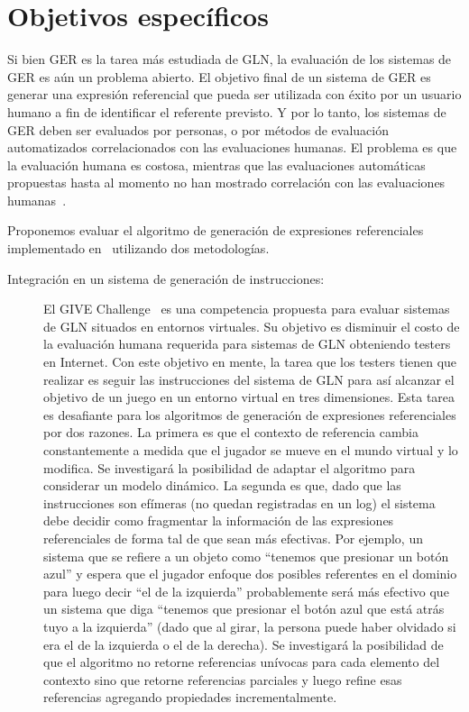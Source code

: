 \section{Objetivos espec\'ificos}
\label{objetivos}

Si bien GER es la tarea m\'as estudiada de GLN, la evaluaci\'on de los sistemas de GER es a\'un un problema abierto. 
El objetivo final de un sistema de GER es generar una expresi\'on referencial que pueda ser utilizada con \'exito por 
un usuario humano a fin de identificar el referente previsto. Y por lo tanto, los sistemas de GER deben ser evaluados 
por personas, o por m\'etodos de evaluaci\'on automatizados correlacionados con las evaluaciones humanas. 
El problema es que la evaluaci\'on humana es costosa, mientras que las evaluaciones autom\'aticas propuestas 
hasta al momento no han mostrado correlaci\'on con las evaluaciones humanas~\cite{Reiter09}.

Proponemos evaluar el algoritmo de generaci\'on de expresiones referenciales implementado en~\cite{Areces2008} 
utilizando dos metodolog\'ias. 

\begin{description}

\item[Integraci\'on en un sistema de generaci\'on de instrucciones:] El GIVE Challenge~\cite{KolByrCasDalStrMooObe09} es una
 competencia propuesta para evaluar sistemas de GLN situados en entornos virtuales. Su objetivo es disminuir el costo de la evaluaci\'on humana requerida para sistemas de GLN obteniendo testers en Internet. Con este objetivo en mente, 
la tarea que los testers tienen que realizar es seguir las instrucciones del sistema de GLN para as\'i alcanzar 
el objetivo de un juego en un entorno virtual en tres dimensiones. Esta tarea es desafiante para los algoritmos 
de generaci\'on de expresiones referenciales por dos razones. La primera es que el contexto de referencia cambia 
constantemente a medida que el jugador se mueve en el mundo virtual y lo modifica. Se investigar\'a la posibilidad 
de adaptar el algoritmo para considerar un modelo din\'amico. La segunda es que, dado que las instrucciones son 
ef\'imeras (no quedan registradas en un log) el sistema debe decidir como fragmentar la informaci\'on de las expresiones
 referenciales de forma tal de que sean m\'as efectivas. Por ejemplo, un sistema que se refiere a un objeto como 
``tenemos que presionar un bot\'on azul'' y espera que el jugador enfoque dos posibles referentes en el dominio 
para luego decir ``el de la izquierda'' probablemente ser\'a m\'as efectivo que un sistema que diga ``tenemos que 
presionar el bot\'on azul que est\'a atr\'as tuyo a la izquierda'' (dado que al girar, la persona puede haber 
olvidado si era el de la izquierda o el de la derecha). Se investigar\'a la posibilidad de que el algoritmo no retorne
 referencias un\'ivocas para cada elemento del contexto sino que retorne referencias parciales y luego refine 
esas referencias agregando propiedades incrementalmente. 
\end{description}


